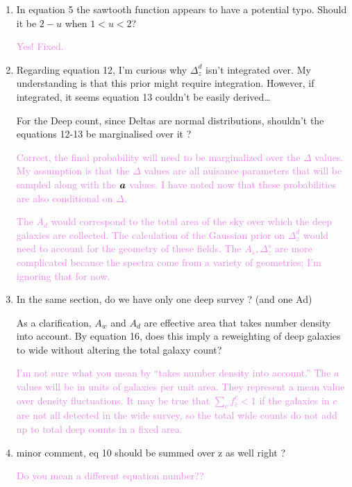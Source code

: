\documentclass[11pt,preprint,flushrt]{aastex631}
\newcommand{\veca}{\mbox{\boldmath $a$}}
\newcommand\answer[1]{\textcolor{violet}{#1}}
\begin{document}
\begin{enumerate}
  \item In equation 5 the sawtooth function appears to have a potential
    typo. Should it be $2-u$ when $1<u<2$?

    \answer{Yes! Fixed.}

\item Regarding equation 12, I’m curious why $\Delta^d_z$ isn’t integrated
over. My understanding is that this prior might require
integration. However, if integrated, it seems equation 13 couldn’t be
easily derived…

For the Deep count, since Deltas are normal distributions, shouldn't the equations 12-13 be marginalised over it ?

\answer{Correct, the final probability will need to be marginalized
  over the $\Delta$ values.  My assumption is that the $\Delta$ values are all nuisance
  parameters that will be sampled along with the $\veca$ values.  I
  have noted now that these probabilities are also conditional on
  $\Delta$.}

\answer{The $A_d$ would correspond to the total area of the sky over
  which the deep galaxies are collected.  The calculation of the
  Gaussian prior on $\Delta^d_z$ would need to account for the
  geometry of these fields.  The $A_s, \Delta^s_z$ are more complicated because the
  spectra come from a variety of geometries; I'm ignoring that for now.}

\item In the same section, do we have only one deep survey ? (and one Ad)

  As a clarification, $A_w$ and $A_d$ are effective area that takes number
density into account. By equation 16, does this imply a reweighting of
deep galaxies to wide without altering the total galaxy count?

\answer{I'm not sure what you mean by ``takes number density into
  account.'' The $a$ values will be in units of galaxies per unit
  area.  They represent a mean value over density fluctuations.  It
  may be true that $\sum_{\hat c} f^c_{\hat c} < 1$ if the galaxies in
  $c$ are not all detected in the wide survey, so the total wide
  counts do not add up to total deep counts in a fixed area.}

\item minor comment, eq 10 should be summed over z as well right ?
  
\answer{Do you mean a different equation number??}



\end{enumerate}
\end{document}

